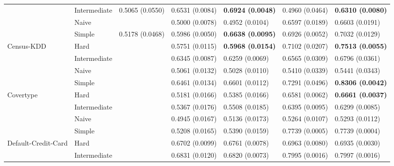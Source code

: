 \begin{tabular}{lllllll}
                 & Intermediate &  0.5065 (0.0550) &           0.6531 (0.0084) &  \textbf{0.6924 (0.0048)} &           0.4960 (0.0464) &  \textbf{0.6310 (0.0080)} \\
                 & Naive &                  &           0.5000 (0.0078) &           0.4952 (0.0104) &           0.6597 (0.0189) &           0.6603 (0.0191) \\
                 & Simple &  0.5178 (0.0468) &           0.5986 (0.0050) &  \textbf{0.6638 (0.0095)} &           0.6926 (0.0052) &           0.7032 (0.0129) \\
Census-KDD & Hard &                  &           0.5751 (0.0115) &  \textbf{0.5968 (0.0154)} &           0.7102 (0.0207) &  \textbf{0.7513 (0.0055)} \\
                 & Intermediate &                  &           0.6345 (0.0087) &           0.6259 (0.0069) &           0.6565 (0.0309) &           0.6796 (0.0361) \\
                 & Naive &                  &           0.5061 (0.0132) &           0.5028 (0.0110) &           0.5410 (0.0339) &           0.5441 (0.0343) \\
                 & Simple &                  &           0.6461 (0.0134) &           0.6601 (0.0112) &           0.7291 (0.0496) &  \textbf{0.8306 (0.0042)} \\
Covertype & Hard &                  &           0.5181 (0.0166) &           0.5385 (0.0166) &           0.6581 (0.0062) &  \textbf{0.6661 (0.0037)} \\
                 & Intermediate &                  &           0.5367 (0.0176) &           0.5508 (0.0185) &           0.6395 (0.0095) &           0.6299 (0.0085) \\
                 & Naive &                  &           0.4945 (0.0167) &           0.5136 (0.0173) &           0.5264 (0.0107) &           0.5293 (0.0112) \\
                 & Simple &                  &           0.5208 (0.0165) &           0.5390 (0.0159) &           0.7739 (0.0005) &           0.7739 (0.0004) \\
Default-Credit-Card & Hard &                  &           0.6702 (0.0099) &           0.6761 (0.0078) &           0.6963 (0.0080) &           0.6935 (0.0030) \\
                 & Intermediate &                  &           0.6831 (0.0120) &           0.6820 (0.0073) &           0.7995 (0.0016) &           0.7997 (0.0016) \\

\end{tabular}

